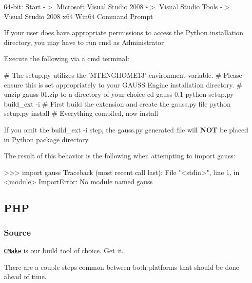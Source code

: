 64-\/bit\-: {\ttfamily Start -\/$>$ Microsoft Visual Studio 2008 -\/$>$ Visual Studio Tools -\/$>$ Visual Studio 2008 x64 Win64 Command Prompt}

If your user does have appropriate permissions to access the Python installation directory, you may have to run {\ttfamily cmd} as Administrator

Execute the following via a {\ttfamily cmd} terminal\-:


\begin{DoxyCode}
\textcolor{preprocessor}{# The setup.py utilizes the 'MTENGHOME13' environment variable.}
\textcolor{preprocessor}{}\textcolor{preprocessor}{# Please ensure this is set appropriately to your GAUSS Engine installation directory.}
\textcolor{preprocessor}{}\textcolor{preprocessor}{# unzip gauss-01.zip to a directory of your choice}
\textcolor{preprocessor}{}cd gauss-0.1
python setup.py build\_ext -i      # First build the extension and create the gauss.py file
python setup.py install           # Everything compiled, now install
\end{DoxyCode}


If you omit the {\ttfamily build\-\_\-ext -\/i} step, the {\ttfamily gauss.\-py} generated file will {\bfseries N\-O\-T} be placed in Python package directory.

The result of this behavior is the following when attempting to {\ttfamily import gauss}\-: \begin{DoxyVerb}>>> import gauss
Traceback (most recent call last):
  File "<stdin>", line 1, in <module>
ImportError: No module named gauss
\end{DoxyVerb}
\hypertarget{index_php_install}{}\subsection{P\-H\-P}\label{index_php_install}
\hypertarget{index_php_install_source}{}\subsubsection{Source}\label{index_php_install_source}
\href{http://www.cmake.org}{\tt C\-Make} is our build tool of choice. Get it.

There are a couple steps common between both platforms that should be done ahead of time.


